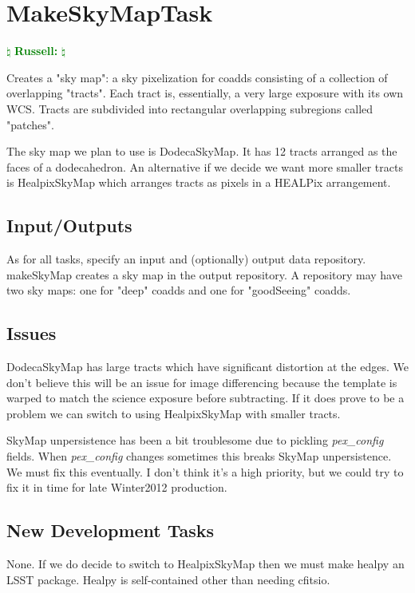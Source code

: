 \documentclass[12pt]{article}
\newcommand{\russ} { \textcolor{green} {
\ensuremath{\natural} {\bf Russell:}  
\ensuremath{\natural} } }
\begin{document}

\clearpage 
\section{MakeSkyMapTask} \russ

Creates a "sky map": a sky pixelization for coadds consisting of a collection of overlapping "tracts".
Each tract is, essentially, a very large exposure with its own WCS.
Tracts are subdivided into rectangular overlapping subregions called "patches".

The sky map we plan to use is DodecaSkyMap. It has 12 tracts arranged as the faces of a dodecahedron.
An alternative if we decide we want more smaller tracts is HealpixSkyMap which arranges
tracts as pixels in a HEALPix arrangement.

\subsection{Input/Outputs}

As for all tasks, specify an input and (optionally) output data repository.
makeSkyMap creates a sky map in the output repository.
A repository may have two sky maps: one for "deep" coadds and one for "goodSeeing" coadds.

\subsection{Issues}
DodecaSkyMap has large tracts which have significant distortion at the edges.
We don't believe this will be an issue for image differencing because the template is warped
to match the science exposure before subtracting. If it does prove to be a problem
we can switch to using HealpixSkyMap with smaller tracts.

SkyMap unpersistence has been a bit troublesome due to pickling {\it pex\_config} fields.
When {\it pex\_config} changes sometimes this breaks SkyMap unpersistence. We must fix this eventually.
I don't think it's a high priority, but we could try to fix it in time for late Winter2012 production.

\subsection{New Development Tasks}

None. If we do decide to switch to HealpixSkyMap then we must make healpy an LSST package.
Healpy is self-contained other than needing cfitsio.
\end{document}
